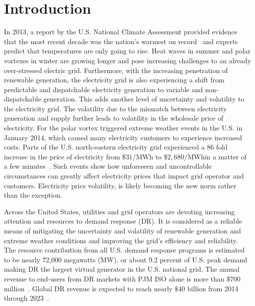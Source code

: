 \documentclass{sig-alternate-ipsn13}
\theoremstyle{definition}
\begin{document}
\section{Introduction}
\label{sec:intro}
In 2013, a report by the U.S. National Climate Assessment provided evidence that the most recent decade was the nation's warmest on record~\cite{melillo2014climate} and experts predict that temperatures are only going to rise.
Heat waves in summer and polar vortexes in winter are growing longer and pose increasing challenges to an already over-stressed electric grid. 
Furthermore, with the increasing penetration of renewable generation, the electricity grid is also experiencing a shift from predictable and dispatchable electricity generation to variable and non-dispatchable generation. 
This adds another level of uncertainty and volatility to the electricity grid.
The volatility due to the mismatch between electricity generation and supply further leads to volatility in the wholesale price of electricity.
For \eg the polar vortex triggered extreme weather events in the U.S. in January 2014, which caused many electricity customers to experience increased costs.
Parts of the U.S. north-eastern electricity grid experienced a $86$ fold increase in the price of electricity from $\$31/\si{\mega\watt\hour}$ to $\$2,680/\si{\mega\watt\hour}$in a matter of a few minutes~\cite{volatility}. 
Such events show how unforeseen and uncontrollable circumstances can greatly affect electricity prices that impact grid operator and customers. 
Electricity price volatility, is likely becoming the new norm rather than the exception.

Across the United States, utilities and grid operators are devoting increasing attention and resources to demand response (DR). It is considered as a reliable means of mitigating the uncertainty and volatility of renewable generation and extreme weather conditions and improving the grid's efficiency and reliability.
The resource contribution from all U.S. demand response programs is estimated to be nearly 72,000 megawatts (MW), or about 9.2 percent of U.S. peak demand~\cite{federal2008assessment} making DR the largest virtual generator in the U.S. national grid.
The annual revenue to end-users from DR markets with PJM ISO alone is more than $\$700$ million~\cite{pjm}. 
Global DR revenue is expected to reach nearly $\$40$ billion from 2014 through 2023~\cite{navigant}.
\end{document}

